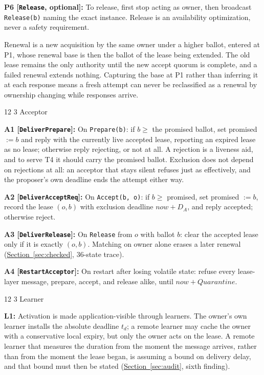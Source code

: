 \documentclass[final,5p,times,twocolumn,number]{elsarticle}
\makeatletter
\newcommand{\code}[1]{\texttt{#1}}
\newcommand{\invitem}[1]{\smallskip\noindent\textbf{#1:} }
\newcommand{\secref}[1]{\hyperref[#1]{Section~\ref*{#1}}}
\renewcommand\subsection{\@startsection{subsection}{2}{\z@}%
           {12\p@ \@plus 6\p@ \@minus 3\p@}%
           {3\p@ \@plus 6\p@ \@minus 3\p@}%
           {\normalfont\normalsize\bfseries}}
\makeatother
\begin{document}
\invitem{P6 [\code{Release}, optional]}To release, first stop acting as owner, then broadcast \code{Release(b)} naming the exact instance.  Release is an availability optimization, never a safety requirement.

\smallskip
Renewal is a new acquisition by the same owner under a higher ballot, entered at P1, whose renewal base is then the ballot of the lease being extended.  The old lease remains the only authority until the new accept quorum is complete, and a failed renewal extends nothing.  Capturing the base at P1 rather than inferring it at each response means a fresh attempt can never be reclassified as a renewal by ownership changing while responses arrive.

\subsection{Acceptor}

\invitem{A1 [\code{DeliverPrepare}]}On \code{Prepare(b)}: if $b \geq$ the promised ballot, set promised $:= b$ and reply with the currently live accepted lease, reporting an expired lease as no lease; otherwise reply rejecting, or not at all.  A rejection is a liveness aid, and to serve T4 it should carry the promised ballot.  Exclusion does not depend on rejections at all: an acceptor that stays silent refuses just as effectively, and the proposer's own deadline ends the attempt either way.

\invitem{A2 [\code{DeliverAcceptReq}]}On \code{Accept(b, o)}: if $b \geq$ promised, set promised $:= b$, record the lease $(o, b)$ with exclusion deadline $now + D_A$, and reply accepted; otherwise reject.

\invitem{A3 [\code{DeliverRelease}]}On \code{Release} from $o$ with ballot $b$: clear the accepted lease only if it is exactly $(o, b)$.  Matching on owner alone erases a later renewal (\secref{sec:checked}, 36-state trace).

\invitem{A4 [\code{RestartAcceptor}]}On restart after losing volatile state: refuse every lease-layer message, prepare, accept, and release alike, until $now + Quarantine$.

\subsection{Learner}

\invitem{L1}Activation is made application-visible through learners.  The owner's own learner installs the absolute deadline $t_d$; a remote learner may cache the owner with a conservative local expiry, but only the owner acts on the lease.  A remote learner that measures the duration from the moment the message arrives, rather than from the moment the lease began, is assuming a bound on delivery delay, and that bound must then be stated (\secref{sec:audit}, sixth finding).
\end{document}
